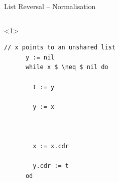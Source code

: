 \documentclass[xcolor={usenames,dvipsnames}]{beamer}
\begin{document}
\newcommand{\stmtgroup}[3]{%
  \draw [thick, ImportantPath, decorate, decoration={brace}]([xshift=3em]#1.north east) -- ([xshift=3em]#2.south east) node[black, midway, xshift=0.5em, anchor=west] {#3};}

\begin{frame}[fragile]{List Reversal -- Normalisation}
  \begin{columns}[T]
	  \begin{onlyenv}
	  \begin{lstlisting}[mathescape=true]
	  // x points to an unshared list
	  y := nil
	  while x $ \neq $ nil do

	    t := y

	    y := x



	    x := x.cdr

	    y.cdr := t
	  od


\end{lstlisting}
\end{onlyenv}
\end{columns}
\end{frame}
\end{document}
